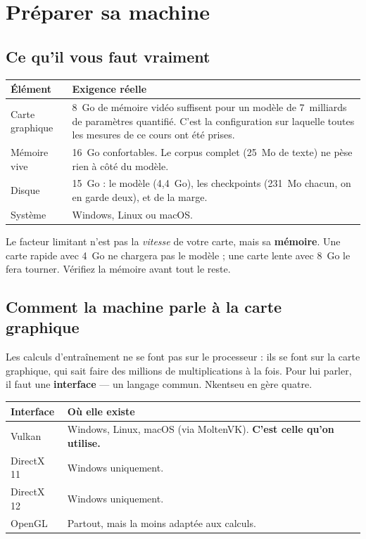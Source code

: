 \chapter{Préparer sa machine}

\section{Ce qu'il vous faut vraiment}

\begin{center}
\begin{tabular}{p{4.2cm}p{9.8cm}}
\toprule
\textbf{Élément} & \textbf{Exigence réelle} \\
\midrule
Carte graphique & 8~Go de mémoire vidéo suffisent pour un modèle de 7~milliards
                  de paramètres quantifié. C'est la configuration sur laquelle
                  toutes les mesures de ce cours ont été prises. \\
Mémoire vive & 16~Go confortables. Le corpus complet (25~Mo de texte) ne pèse
               rien à côté du modèle. \\
Disque & 15~Go : le modèle (4,4~Go), les checkpoints (231~Mo chacun, on en
         garde deux), et de la marge. \\
Système & Windows, Linux ou macOS. \\
\bottomrule
\end{tabular}
\end{center}

\begin{nkpiege}
Le facteur limitant n'est pas la \emph{vitesse} de votre carte, mais sa
\textbf{mémoire}. Une carte rapide avec 4~Go ne chargera pas le modèle ; une
carte lente avec 8~Go le fera tourner. Vérifiez la mémoire avant tout le reste.
\end{nkpiege}

\section{Comment la machine parle à la carte graphique}

Les calculs d'entraînement ne se font pas sur le processeur : ils se font sur la
carte graphique, qui sait faire des millions de multiplications à la fois. Pour
lui parler, il faut une \textbf{interface} — un langage commun. Nkentseu en
gère quatre.

\begin{center}
\begin{tabular}{lp{9.4cm}}
\toprule
\textbf{Interface} & \textbf{Où elle existe} \\
\midrule
Vulkan  & Windows, Linux, macOS (via MoltenVK). \textbf{C'est celle qu'on
          utilise.} \\
DirectX 11 & Windows uniquement. \\
DirectX 12 & Windows uniquement. \\
OpenGL  & Partout, mais la moins adaptée aux calculs. \\
\bottomrule
\end{tabular}
\end{center}


